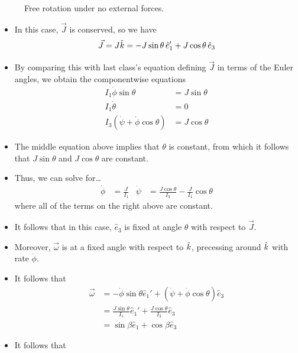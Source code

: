 \documentclass[../notes.tex]{subfiles}
\begin{document}
\begin{itemize}
\begin{figure}[h!]
        \caption{Free rotation under no external forces.}
        \label{fig:FreeRot1}
    \end{figure}
    \begin{itemize}
        \item In this case, $\vec{J}$ is conserved, so we have
        \begin{equation*}
            \vec{J} = J\hat{k}=-J\sin\theta\,\hat{e}_1'+J\cos\theta\,\hat{e}_3
        \end{equation*}
        \item By comparing this with last class's equation defining $\vec{J}$ in terms of the Euler angles, we obtain the componentwise equations
        \begin{align*}
            I_1\dot{\phi}\sin\theta &= J\sin\theta\\
            I_1\dot{\theta} &= 0\\
            I_3(\dot{\psi}+\dot{\phi}\cos\theta) &= J\cos\theta
        \end{align*}
        \item The middle equation above implies that $\theta$ is constant, from which it follows that $J\sin\theta$ and $J\cos\theta$ are constant.
        \item Thus, we can solve for\dots
        \begin{align*}
            \dot{\phi} &= \frac{J}{I_1}&
            \dot{\psi} &= \frac{J\cos\theta}{I_3}-\frac{J}{I_1}\cos\theta
        \end{align*}
        where all of the terms on the right above are constant.
        \item It follows that in this case, $\hat{e}_3$ is fixed at angle $\theta$ with respect to $\vec{J}$.
        \item Moreover, $\vec{\omega}$ is at a fixed angle with respect to $\hat{k}$, precessing around $\hat{k}$ with rate $\dot{\phi}$.
        \item It follows that
        \begin{align*}
            \vec{\omega} &= -\dot{\phi}\sin\theta\hat{e}_1'+(\dot{\psi}+\dot{\phi}\cos\theta)\hat{e}_3\\
            &= \frac{J\sin\theta}{I_1}\hat{e}_1'+\frac{J\cos\theta}{I_3}\hat{e}_3\\
            &= \sin\beta\hat{e}_1+\cos\beta\hat{e}_3
        \end{align*}
        \item It follows that
        \begin{equation*}

\end{equation*}
\end{itemize}
\end{itemize}
\end{document}
